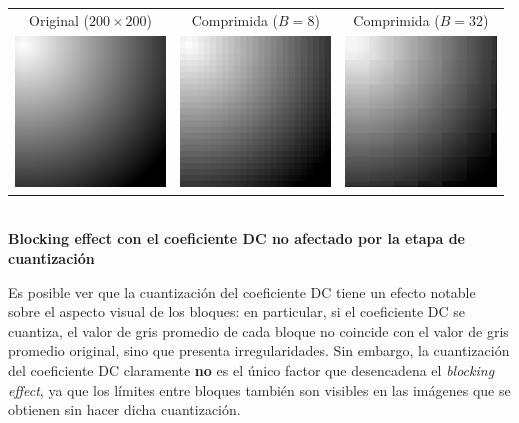 \documentclass{article}
\begin{document}
\begin{center}
\begin{tabular}{|c|c|c|}
\hline
Original ($200 \times 200$)
&
Comprimida ($B = 8$)
&
Comprimida ($B = 32$)
\\
\includegraphics[width=4cm]{../imgs/output/blocking_effect/blocking.png}
&
\includegraphics[width=4cm]{../imgs/output/blocking_effect/blocking_notrunc_b8.png}
&
\includegraphics[width=4cm]{../imgs/output/blocking_effect/blocking_notrunc_b32.png} \\
\hline
\end{tabular}\\
{\bf Blocking effect con el coeficiente DC no afectado por la etapa de cuantización}
\end{center}

Es posible ver que la cuantización del coeficiente DC tiene un efecto
notable sobre el aspecto visual de los bloques: en particular, si el
coeficiente DC se cuantiza, el valor de gris promedio de cada bloque
no coincide con el valor de gris promedio original, sino que presenta
irregularidades.
Sin embargo, la cuantización del coeficiente DC claramente {\bf no} es el
único factor que desencadena el {\em blocking effect}, ya que los
límites entre bloques también son visibles en las imágenes que
se obtienen sin hacer dicha cuantización.
\end{document}
